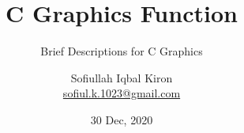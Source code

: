 % 
%
%
%
%
%
%
%


\documentclass[9 pt]{beamer}

\usepackage
{
	listings, %
	authblk, %
	anyfontsize,
	graphicx,
	transparent %
}

\title[Graphics Tutorial]{C Graphics Function}
\subtitle{Brief Descriptions for C Graphics}
\author[S. I. Kiron]
{
	Sofiullah Iqbal Kiron \\
	\href{mailto:sofiul.k.1023@gmail.com}{sofiul.k.1023@gmail.com}
}
\date[Wednesday]{30 Dec, 2020}

\lstset
{
 language = C++,
 backgroundcolor = \color{white},
 basicstyle = \footnotesize\ttfamily,
 keywordstyle = \color{blue},
 commentstyle = \color{green!80}\tiny,
 showstringspaces = false,
 stringstyle = \color{red},
 captionpos = b
}





